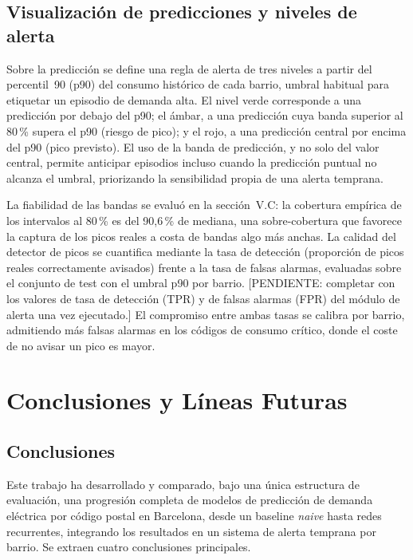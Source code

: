 \documentclass[12pt, a4paper]{article}
\begin{document}
\subsection{Visualización de predicciones y niveles de alerta}

Sobre la predicción se define una regla de alerta de tres niveles a partir del percentil~90 (p90) del consumo histórico de cada barrio, umbral habitual para etiquetar un episodio de demanda alta. El nivel verde corresponde a una predicción por debajo del p90; el ámbar, a una predicción cuya banda superior al 80\,\% supera el p90 (riesgo de pico); y el rojo, a una predicción central por encima del p90 (pico previsto). El uso de la banda de predicción, y no solo del valor central, permite anticipar episodios incluso cuando la predicción puntual no alcanza el umbral, priorizando la sensibilidad propia de una alerta temprana.

La fiabilidad de las bandas se evaluó en la sección~V.C: la cobertura empírica de los intervalos al 80\,\% es del 90,6\,\% de mediana, una sobre-cobertura que favorece la captura de los picos reales a costa de bandas algo más anchas. La calidad del detector de picos se cuantifica mediante la tasa de detección (proporción de picos reales correctamente avisados) frente a la tasa de falsas alarmas, evaluadas sobre el conjunto de test con el umbral p90 por barrio. [PENDIENTE: completar con los valores de tasa de detección (TPR) y de falsas alarmas (FPR) del módulo de alerta una vez ejecutado.] El compromiso entre ambas tasas se calibra por barrio, admitiendo más falsas alarmas en los códigos de consumo crítico, donde el coste de no avisar un pico es mayor.

\section{Conclusiones y Líneas Futuras}

\subsection{Conclusiones}

Este trabajo ha desarrollado y comparado, bajo una única estructura de evaluación, una progresión completa de modelos de predicción de demanda eléctrica por código postal en Barcelona, desde un baseline \textit{naive} hasta redes recurrentes, integrando los resultados en un sistema de alerta temprana por barrio. Se extraen cuatro conclusiones principales.
\end{document}
